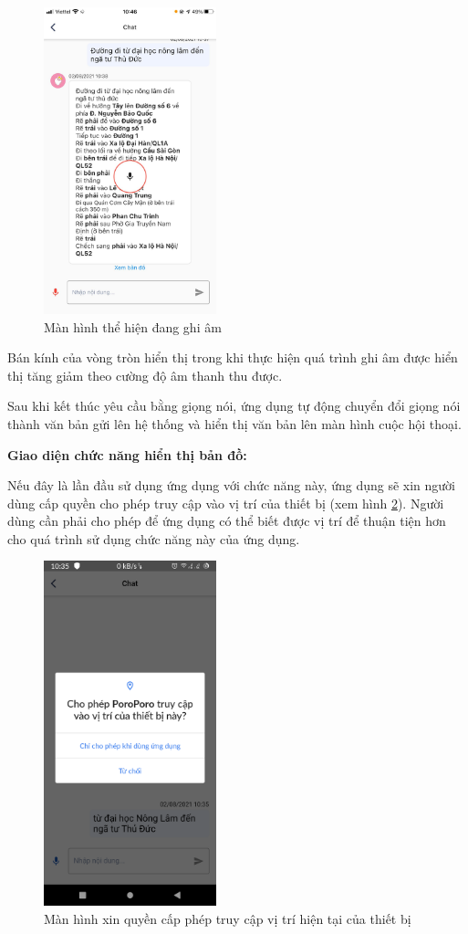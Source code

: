\begin{figure}[H]
    \centering
    \includegraphics[width=5cm]{images/Screen-record.png}
    \caption{Màn hình thể hiện đang ghi âm}
    \label{fig:screen-record}
\end{figure}

Bán kính của vòng tròn hiển thị trong khi thực hiện quá trình ghi âm được hiển thị tăng giảm theo cường độ âm thanh thu được.

Sau khi kết thúc yêu cầu bằng giọng nói, ứng dụng tự động chuyển đổi giọng nói thành văn bản gửi lên hệ thống và hiển thị văn bản lên màn hình cuộc hội thoại.

\textbf{Giao diện chức năng hiển thị bản đồ:}

Nếu đây là lần đầu sử dụng ứng dụng với chức năng này, ứng dụng sẽ xin người dùng cấp quyền cho phép truy cập vào vị trí của thiết bị (xem hình \ref{fig: accesss-location}). Người dùng cần phải cho phép để ứng dụng có thể biết được vị trí để thuận tiện hơn cho quá trình sử dụng chức năng này của ứng dụng.

\begin{figure}[H]
    \centering
    \includegraphics[width=5cm]{images/access_location.jpg}
    \caption{Màn hình xin quyền cấp phép truy cập vị trí hiện tại của thiết bị}
    \label{fig: accesss-location}
\end{figure}

